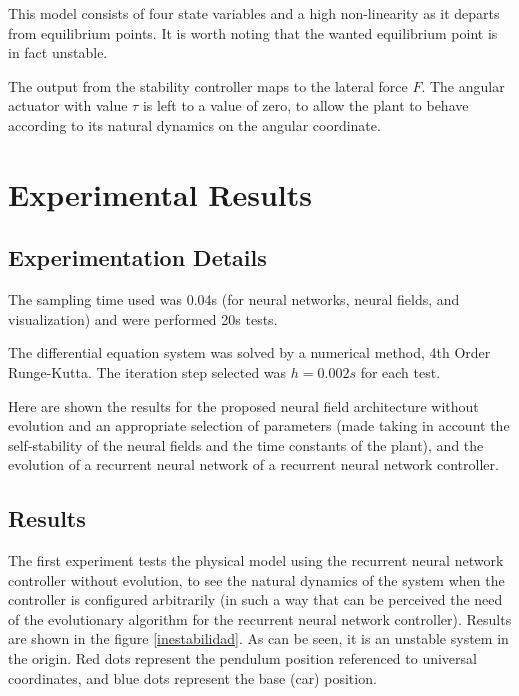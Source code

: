 This model consists of four state variables and a high non-linearity
as it departs from equilibrium points. It is worth noting that the
wanted equilibrium point is in fact unstable.

The output from the stability controller maps to the lateral force
$F$. The angular actuator with value $\tau$ is left to a value of
zero, to allow the plant to behave according to its natural dynamics
on the angular coordinate.


\section{Experimental Results}
\subsection*{Experimentation Details}
The sampling time used was 0.04s (for neural networks, neural fields, and
visualization) and were performed 20s tests.

The differential equation system was solved by a numerical method,
4th Order Runge-Kutta. The iteration step selected was $h=0.002s$ for
each test.

Here are shown the results for the proposed neural field architecture
without evolution and an appropriate selection of parameters (made
taking in account the self-stability of the neural fields and the time
constants of the plant), and the evolution of a recurrent neural
network of a recurrent neural network controller.

\subsection*{Results}
The first experiment tests the physical model using the recurrent
neural network controller without evolution, to see the natural dynamics of the system when the
controller is configured arbitrarily (in such a way that can be perceived
the need of the evolutionary algorithm for the recurrent neural
network controller). Results are shown in the figure
\ref{inestabilidad}. As can be seen, it is an unstable system in the
origin. Red dots represent the pendulum position referenced to
universal coordinates, and blue dots represent the base (car)
position.



